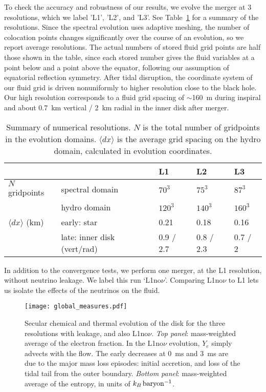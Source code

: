 To check the accuracy and robustness of our results, we evolve
the merger at 3 resolutions, which we label 'L1',
'L2', and 'L3'. See Table~\ref{tab:resolutions} for a
summary of the resolutions.  Since the
spectral evolution uses adaptive meshing, the number of colocation
points changes significantly over the course of an evolution, so
we report average resolutions.  The actual numbers of stored fluid
grid points are half those shown in the table, since each stored number
gives the fluid variables at a point below and a point above the
equator, following our assumption of equatorial reflection symmetry. 
After tidal disruption, the coordinate system of our fluid grid
is driven nonuniformly to higher resolution close to the black hole.
Our high resolution corresponds to a fluid grid spacing of $\sim$160~m during
inspiral and about 0.7~km vertical / 2~km radial in the inner
disk after merger.

\begin{table}
  \centering
  \begin{tabular}{ l l l l l }
    \toprule
                    &                             & L1        & L2        & L3 \\
    \midrule
    $N$ gridpoints  & spectral domain             & $70^3$    & $75^3$    & $87^3$ \\
                    & hydro domain                & $120^3$   & $140^3$   & $160^3$ \\
    \midrule
    $\langle dx \rangle$ (km) & early: star       & 0.21      & 0.18      & 0.16 \\
                    & late: inner disk (vert/rad) & 0.9 / 2.7 & 0.8 / 2.3 & 0.7 / 2 \\
    \bottomrule
  \end{tabular}
  \caption{
    Summary of numerical resolutions. $N$ is the total number of gridpoints in the
    evolution domains. $\langle dx \rangle$ is the average grid spacing on the hydro
    domain, calculated in evolution coordinates.
  }
  \label{tab:resolutions}
\end{table}

In addition to the convergence tests, we perform one merger, at the
L1 resolution, without neutrino leakage.  We label this
run `L1no$\nu$'.  Comparing L1no$\nu$ to L1 lets us isolate
the effects of the neutrinos on the fluid.

\begin{figure*} \centering
\texttt{[image: global\_measures.pdf]}
\caption{
Secular chemical and thermal evolution of the disk for the three resolutions
with leakage, and also L1no$\nu$.
{\em Top panel}: mass-weighted average of the electron fraction.
In the L1no$\nu$ evolution, $Y_e$ simply advects with the flow.
The early decreases at 0~ms and 3~ms are due to the major mass loss episodes:
initial accretion, and loss of the tidal tail from the outer boundary.
{\em Bottom panel}: mass-weighted average of the entropy, in units of
$k_B\rm\,baryon^{-1}$.
}
\label{fig:globalevolution}
\end{figure*}

